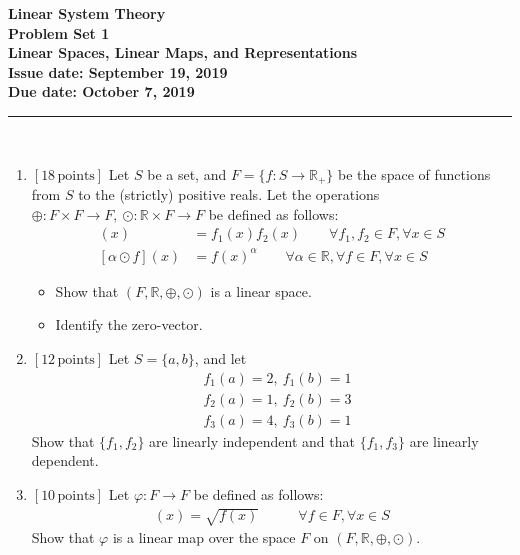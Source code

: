 \documentclass[fleqn, 10.5pt, a4paper]{article}
\newcommand\R{{\mathbb R}}
\theoremstyle{definition}
\numberwithin{equation}{section}
\begin{document}
\thispagestyle{plain}

\vspace*{-1.5cm}{\noindent \rule{15.8cm}{.3mm} \\[.3cm]}
\begin{center} \bf
{\large Linear System Theory \medskip \\
Problem Set 1 \\
Linear Spaces, Linear Maps, and Representations\medskip \\
Issue date: September 19, 2019 \\ Due date: October 7, 2019}
\end{center}
\rule{15.8cm}{.3mm} \\[0cm]

\begin{enumerate}
	\item {\bf$[18\, \text{points}]$}
	Let $S$ be a set, and $F = \{f: S\rightarrow \R_+ \}$ be the space of functions from $S$ to
	the (strictly) positive reals. Let the operations $\oplus:F\times F \rightarrow F,\ \odot:\R\times F\rightarrow F$ be defined as
	follows:
	\begin{align*}
	[f_1 \oplus f_2] (x) &= f_1(x)f_2(x) \quad\quad \forall f_1,f_2 \in F, \forall x\in S \\
	[\alpha \odot f] (x) &= f(x)^\alpha \quad\quad \forall \alpha\in\mathbb{R}, \forall f \in F, \forall x\in S 
	\end{align*}
	\begin{itemize}
		\item Show that $(F, \R, \oplus,\odot)$ is a linear space. 
		\item Identify the zero-vector.
	\end{itemize}
	
	\item {\bf$[12\, \text{points}]$}
	Let $S=\{a,b\}$, and let
	\begin{align*}
	&f_1(a) = 2,\ f_1(b) = 1 \\
	&f_2(a) = 1,\ f_2(b) = 3 \\ 
	&f_3(a) = 4,\ f_3(b) = 1 
	\end{align*}
	Show that $\{f_1, f_2\}$ are linearly independent and that $\{f_1, f_3\}$ are linearly dependent.
	
	\item {\bf$[10\, \text{points}]$}
	Let $\varphi:F\rightarrow F$ be defined as follows:
	\begin{align*}
	[\varphi(f)] (x) = \sqrt{f(x)} &\quad\quad \forall f\in F, \forall x\in S 
	\end{align*}
	Show that $\varphi$ is a linear map over the space $F$ on $(F, \mathbb{R}, \oplus, \odot)$.
	
\end{enumerate}
\end{document}

